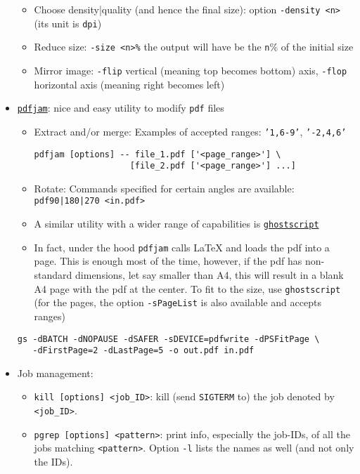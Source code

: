 \documentclass[a4paper,12pt,%
              final%
              ]{article}
\begin{document}
\begin{itemize}
\begin{itemize}
      \item Choose density|quality (and hence the final size): option \verb|-density <n>| (its unit is \texttt{dpi})
      \item Reduce size: \verb|-size <n>%| the output will have be the \verb|n|\% of the initial size
      \item Mirror image: \verb|-flip| vertical (meaning top becomes bottom) axis, \verb|-flop| horizontal axis (meaning right becomes left)
    \end{itemize}
  \item \href{https://github.com/DavidFirth/pdfjam#using}{\texttt{pdfjam}}: nice and easy utility to modify \texttt{pdf} files
    \begin{itemize}
      \item Extract and/or merge: Examples of accepted ranges: \texttt{'1,6-9'}, \texttt{'-2,4,6'}
\begin{verbatim}
pdfjam [options] -- file_1.pdf ['<page_range>'] \
                   [file_2.pdf ['<page_range>'] ...]
\end{verbatim}
      \item Rotate: Commands specified for certain angles are available: \verb!pdf90|180|270 <in.pdf>!
      \item A similar utility with a wider range of capabilities is \href{https://www.ghostscript.com/doc/current/Use.htm}{\texttt{ghostscript}}
      \item In fact, under the hood \texttt{pdfjam} calls \LaTeX{} and loads the pdf into a page. This is enough most of the time, however, if the pdf has non-standard dimensions, let say smaller than A4, this will result in a blank A4 page with the pdf at the center. To fit to the size, use \texttt{ghostscript} (for the pages, the option \texttt{-sPageList} is also available and accepts ranges)
    \end{itemize}
\begin{verbatim}
gs -dBATCH -dNOPAUSE -dSAFER -sDEVICE=pdfwrite -dPSFitPage \
   -dFirstPage=2 -dLastPage=5 -o out.pdf in.pdf
\end{verbatim}
  \item Job management:
    \begin{itemize}
      \item \verb|kill [options] <job_ID>|: kill (send \texttt{SIGTERM} to) the job denoted by \verb|<job_ID>|.
      \item \verb|pgrep [options] <pattern>|: print info, especially the job-IDs, of all the jobs matching \verb|<pattern>|. Option \verb|-l| lists the names as well (and not only the IDs).

\end{itemize}
\end{itemize}
\end{document}
